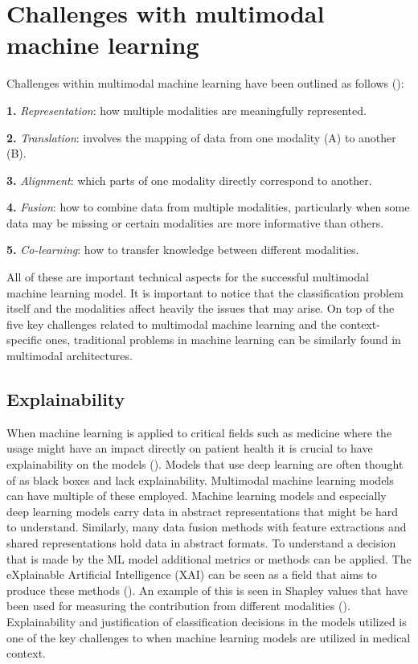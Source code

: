 
\section{Challenges with multimodal machine learning}

Challenges within multimodal machine learning have been outlined as follows (\cite{8269806}):

\textbf{1.} \textit{Representation}: how multiple modalities are meaningfully represented.

\textbf{2.} \textit{Translation}: involves the mapping of data from one modality (A) to another (B).

\textbf{3.} \textit{Alignment}: which parts of one modality directly correspond to another.

\textbf{4.} \textit{Fusion}: how to combine data from multiple modalities, particularly when some data may be missing or certain modalities are more informative than others.

\textbf{5.} \textit{Co-learning}: how to transfer knowledge between different modalities.



All of these are important technical aspects for the successful multimodal machine learning model. It is important to notice that the classification problem itself and the modalities affect heavily the issues that may arise. On top of the five key challenges related to multimodal machine learning and the context-specific ones, traditional problems in machine learning can be similarly found in multimodal architectures. 

\subsection{Explainability}

When machine learning is applied to critical fields such as medicine where the usage might have an impact directly on patient health it is crucial to have explainability on the models (\cite{article44}). Models that use deep learning are often thought of as black boxes and lack explainability. Multimodal machine learning models can have multiple of these employed. Machine learning models and especially deep learning models carry data in abstract representations that might be hard to understand. Similarly, many data fusion methods with feature extractions and shared representations hold data in abstract formats. To understand a decision that is made by the ML model additional metrics or methods can be applied. The eXplainable Artificial Intelligence (XAI) can be seen as a field that aims to produce these methods (\cite{XAI}). An example of this is seen in Shapley values that have been used for measuring the contribution from different modalities (\cite{articlehaim}). Explainability and justification of classification decisions in the models utilized is one of the key challenges to when machine learning models are utilized in medical context. 

